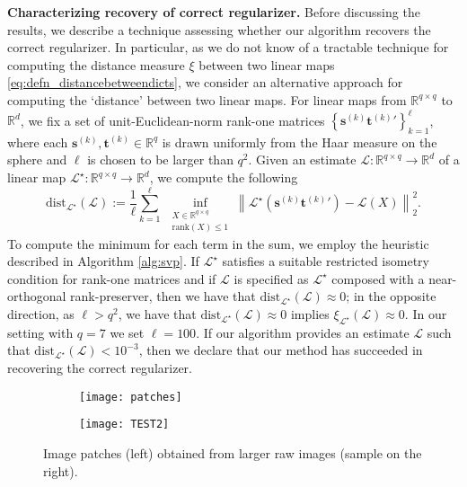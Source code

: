 \documentclass[11pt,letterpaper]{article}
\newcommand{\R}{\mathbb{R}}
\renewcommand{\L}{\mathcal{L}}
\newcommand{\bs}{\mathbf{s}}
\newcommand{\bt}{\mathbf{t}}
\begin{document}
\textbf{Characterizing recovery of correct regularizer.} Before discussing the results, we describe a technique assessing whether our algorithm recovers the correct regularizer.  In particular, as we do not know of a tractable technique for computing the distance measure $\xi$ between two linear maps \eqref{eq:defn_distancebetweendicts}, we consider an alternative approach for computing the `distance' between two linear maps. For linear maps from $\R^{q \times q}$ to $\R^d$, we fix a set of unit-Euclidean-norm rank-one matrices $\left\{\bs^{(k)} {\bt^{(k)}}' \right\}_{k=1}^{\ell}$, where each $\bs^{(k)}, \bt^{(k)} \in \R^{q}$ is drawn uniformly from the Haar measure on the sphere and $\ell$ is chosen to be larger than $q^2$.  Given an estimate $\L : \R^{q \times q} \rightarrow \R^{d}$ of a linear map $\L^\star : \R^{q \times q} \rightarrow \R^d$, we compute the following
\begin{equation} \label{eq:distmeasuretwomaps}
\mathrm{dist}_{\L^\star}(\L):=\frac{1}{\ell} \sum_{k=1}^{\ell} ~ \underset{\substack{X \in \R^{q \times q} \\ \mathrm{rank}(X) \leq 1}}{\inf} \left\| \L^\star \left(\bs^{(k)} {\bt^{(k)}}'\right) - \L(X) \right\|_2^2.
\end{equation}
To compute the minimum for each term in the sum, we employ the heuristic described in Algorithm \ref{alg:svp}.  If $\L^\star$ satisfies a suitable restricted isometry condition for rank-one matrices and if $\L$ is specified as $\L^\star$ composed with a near-orthogonal rank-preserver, then we have that $\mathrm{dist}_{\L^\star}(\L) \approx 0$; in the opposite direction, as $\ell > q^2$, we have that $\mathrm{dist}_{\L^\star}(\L) \approx 0$ implies $\xi_{\L^{\star}}(\L) \approx 0$.  In our setting with $q = 7$ we set $\ell = 100$.  If our algorithm provides an estimate $\L$ such that $\mathrm{dist}_{\L^\star}(\L) < 10^{-3}$, then we declare that our method has succeeded in recovering the correct regularizer.

\begin{figure}
	\centering
	\begin{subfigure}{.5\textwidth}
		\centering
		\texttt{[image: patches]}
		\label{fig:imagepatches}
	\end{subfigure}%
	\begin{subfigure}{.5\textwidth}
		\centering
		\texttt{[image: TEST2]}
		\label{fig:samplerawimg}
	\end{subfigure}
	\caption{Image patches (left) obtained from larger raw images (sample on the right).}
	\label{fig:rawimages}
\end{figure}
\end{document}
